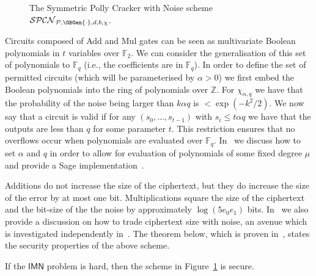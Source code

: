 \documentclass[draft]{llncs}
\newcommand{\heading}[1]{{\vspace{6pt}\noindent\sc{#1.}}}
\newcommand{\ring}[1]{\mathbb{#1}}
\newcommand{\F}{\ensuremath{\ring{F}}\xspace}
\newcommand{\Z}{\ensuremath{\ring{Z}}\xspace}
\newcommand{\IMN}{\ensuremath{\mathsf{IMN}}\xspace}
\newcommand{\Eval}{\mathsf{Eval}}
\newcommand{\PK}{\mathsf{PK}}
\newcommand{\Circt}{C}
\newcommand{\px}{\phantom{i}}
\begin{document}
\begin{figure}[ht]
{
}
\caption{The Symmetric Polly Cracker with Noise scheme $\mathcal{SPCN}_{\mathcal{P},\GBGen{\cdot},d,b,\chi}$.}
\label{fig.spcn}
\vspace{-6mm} \end{figure}

\heading{Permitted Circuits} Circuits composed of \textsf{Add} and \textsf{Mul} gates can be seen as multivariate Boolean polynomials in $t$ variables over $\F_2$. We can consider the generalisation of this set of polynomials to $\F_q$ (i.e., the coefficients are in $\F_q$). In order to define the set of permitted circuits (which will be parameterised by $\alpha>0$) we first embed the Boolean polynomials into the ring of polynomials over $\Z$. For $\chi_{\alpha,q}$ we have that the probability of the noise being larger than $k\alpha q$ is $< \exp(-k^2/2)$. We now say that a circuit is valid if for any $(s_0,\ldots,s_{t-1})$ with $s_i \le t\alpha q$ we have that the outputs are less than $q$ for some parameter $t$. This restriction ensures that no overflows occur when polynomials are evaluated over $\F_q$. In~\cite{full} we discuss how to set $\alpha$ and $q$ in order to allow for evaluation of polynomials of some fixed degree $\mu$ and provide a Sage implementation~\cite{sage}.

\heading{Compactness} Additions do not increase the size of the ciphertext, but they do increase the size of the error by at most one bit. Multiplications square the size of the ciphertext and the bit-size of the the noise by approximately $\log(5e_0e_1)$ bits. In~\cite{full} we also provide a discussion on how to trade ciphertext size with noise, an avenue which is investigated independently in~\cite{LWEhom}. The theorem below, which is proven in~\cite{full}, states the security properties of the above scheme. 
\begin{theorem}
\label{thm:spcn}
If the $\IMN$ problem is hard, then the scheme in Figure~\ref{fig.spcn} is secure. 
\end{theorem}
\end{document}
